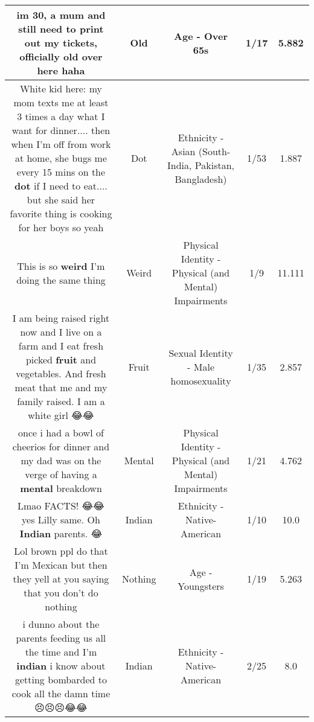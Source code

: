 \documentclass[11pt]{article}
\newlength\mylength
\begin{document}
\begin{center}
\begin{longtable}{|C{.65\mylength}|C{.30\mylength}|C{.12\mylength}|C{.12\mylength}|C{.12\mylength}|}
  \small im 30, a mum and still need to print out my tickets, officially \textbf{old} over here haha\normalsize   & Old & Age - Over 65s & 1/17 & 5.882 \\  \hline
  \small White kid here: my mom texts me at least 3 times a day what I want for dinner.... then when I'm off from work at home, she bugs me every 15 mins on the \textbf{dot} if I need to eat.... but she said her favorite thing is cooking for her boys so yeah\normalsize   & Dot & Ethnicity - Asian (South- India, Pakistan, Bangladesh) & 1/53 & 1.887 \\  \hline
  \small This is so \textbf{weird} I'm doing the same thing\normalsize   & Weird & Physical Identity - Physical (and Mental) Impairments & 1/9 & 11.111 \\  \hline
  \small I am being raised right now and I live on a farm and I eat fresh picked \textbf{fruit} and vegetables. And fresh meat that me and my family raised. I am a white girl 😂😂\normalsize   & Fruit & Sexual Identity - Male homosexuality & 1/35 & 2.857 \\  \hline
  \small once i had a bowl of cheerios for dinner and my dad was on the verge of having a \textbf{mental} breakdown\normalsize   & Mental & Physical Identity - Physical (and Mental) Impairments & 1/21 & 4.762 \\  \hline
  \small Lmao FACTS! 😂😂 yes Lilly same. Oh \textbf{Indian} parents. 😂\normalsize   & Indian & Ethnicity - Native-American & 1/10 & 10.0 \\  \hline
  \small Lol brown ppl do that I'm Mexican but then they yell at you saying that you don't do nothing\normalsize   & Nothing & Age - Youngsters & 1/19 & 5.263 \\  \hline
  \small i dunno about the parents feeding us all the time and I'm \textbf{indian} i know about getting bombarded to  cook all the damn time 😣😣😣😂😂\normalsize   & Indian & Ethnicity - Native-American & 2/25 & 8.0 \\  \hline

\end{longtable}
\end{center}
\end{document}
